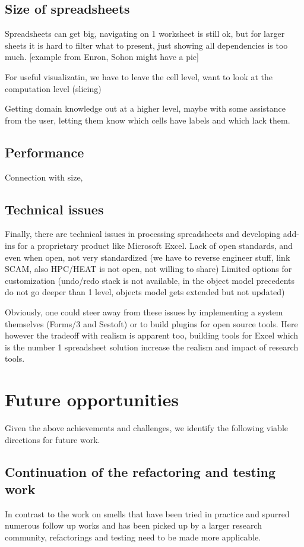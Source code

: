 \documentclass[conference]{IEEEtran}
\begin{document}
\subsection{Size of spreadsheets }
Spreadsheets can get big, navigating on 1 worksheet is still ok, but for larger sheets it is hard to filter what to present, just showing all dependencies is too much. [example from Enron, Sohon might have a pic]

For useful visualizatin, we have to leave the cell level, want to look at the computation level (slicing)

Getting domain knowledge out at a higher level, maybe with some assistance from the user, letting them know which cells have labels and which lack them.

\subsection{Performance}
Connection with size, 

\subsection{Technical issues}
Finally, there are technical issues in processing spreadsheets and developing add-ins for a proprietary product like Microsoft Excel. 
Lack of open standards, and even when open, not very standardized (we have to reverse engineer stuff, link SCAM, also HPC/HEAT is not open, not willing to share)
Limited options for customization (undo/redo stack is not available, in the object model precedents do not go deeper than 1 level, objects model gets extended but not updated)

Obviously, one could steer away from these issues by implementing a system themselves (Forms/3 and Sestoft) or to build plugins for open source tools. Here however the tradeoff with realism is apparent too, building tools for Excel which is the number 1 spreadsheet solution increase the realism and impact of research tools.

\section{Future opportunities}
Given the above achievements  and challenges, we identify the following viable directions for future work.

\subsection{Continuation of the refactoring and testing work}
In contrast to the work on smells that have been tried in practice and spurred numerous follow up works and has been picked up by a larger research community, refactorings and testing need to be made more applicable.
\end{document}
